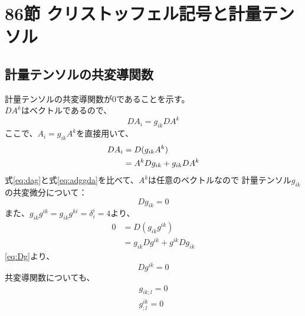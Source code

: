 \documentclass{jsarticle}
\begin{document}
\section{86節 クリストッフェル記号と計量テンソル}

\subsection{計量テンソルの共変導関数}
計量テンソルの共変導関数が0であることを示す。\\
$DA^{k}$はベクトルであるので、%
\begin{equation}
    DA_{i} = g_{ik} DA^{k}\label{eq:dag}
\end{equation}
ここで、$A_{i} = g_{ik} A^{k}$を直接用いて、
\begin{align}
    DA_{i} &= D(g_{ik}A^{k}) \notag\\
           &= A^{k}Dg_{ik} + g_{ik} DA^{k}\label{eq:adggda}
\end{align}
式\eqref{eq:dag}と式\eqref{eq:adggda}を比べて、$A^{k}$は任意のベクトルなので
計量テンソル$g_{ik}$の共変微分について：
\begin{equation}
    Dg_{ik} = 0 \label{eq:Dg}
\end{equation}
また、$g_{ik}g^{ik}=g_{ik}g^{ki}=\delta^{i}_{i}=4$より、
\begin{align}
    0 &= D(g_{ik}g^{ik}) \\
      &= g_{ik}Dg^{ik} + g^{ik}Dg_{ik}
\end{align}
\eqref{eq:Dg}より、
\begin{equation}
    Dg^{ik} = 0
\end{equation}
共変導関数についても、
\begin{align}
    g_{ik;l} = 0 \label{eq:gikl}\\
    g^{ik}_{;l} = 0
\end{align}
\end{document}
